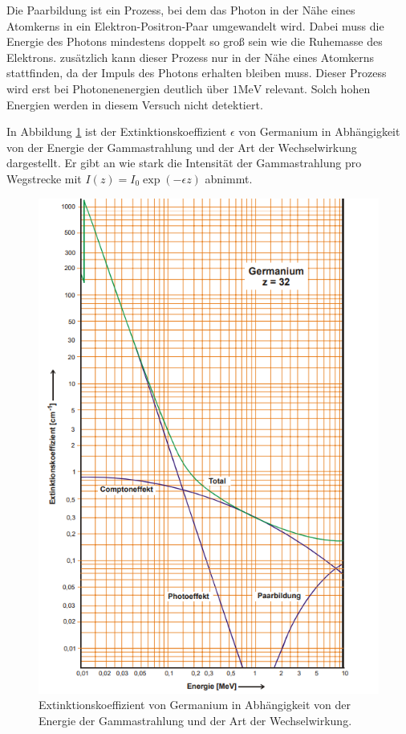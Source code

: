 \noindent Die Paarbildung ist ein Prozess, bei dem das Photon in der Nähe eines Atomkerns in ein Elektron-Positron-Paar umgewandelt wird. Dabei muss die Energie des Photons mindestens doppelt so groß sein wie die Ruhemasse des Elektrons.
zusätzlich kann dieser Prozess nur in der Nähe eines Atomkerns stattfinden, da der Impuls des Photons erhalten bleiben muss. Dieser Prozess wird erst bei Photonenenergien deutlich über $1\si{\mega\electronvolt}$ relevant.
Solch hohen Energien werden in diesem Versuch nicht detektiert.

\noindent In Abbildung \ref{fig:Extinktion} ist der Extinktionskoeffizient $\epsilon$ von Germanium in Abhängigkeit von der Energie der Gammastrahlung und der Art der Wechselwirkung dargestellt.
Er gibt an wie stark die Intensität der Gammastrahlung pro Wegstrecke mit $ I(z)=I_0\exp(-\epsilon z)$ abnimmt.
\begin{figure}[H]
    \centering
    \includegraphics[scale=1.0]{illustration/Extinktionskoeffizient.png}
    \caption{Extinktionskoeffizient von Germanium in Abhängigkeit von der Energie der Gammastrahlung und der Art der Wechselwirkung.\cite{AnleitungAlt}}
    \label{fig:Extinktion}
\end{figure}
